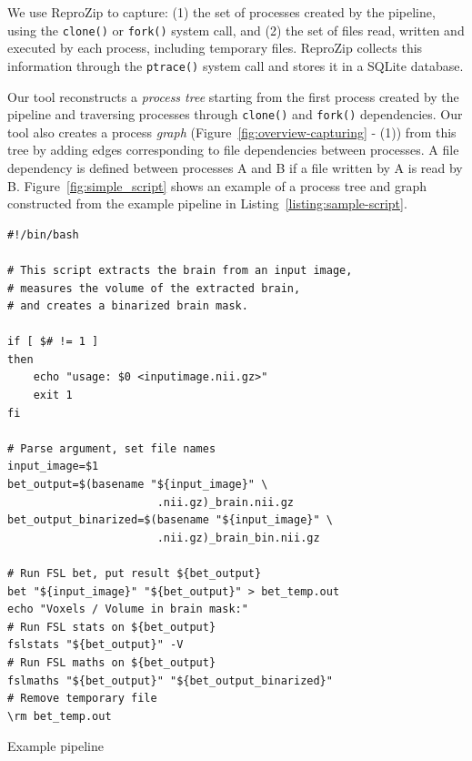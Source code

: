 \documentclass[a4paper,num-refs]{oup-contemporary}
\newcommand{\reprozip}[0]{ReproZip\xspace}
\begin{document}
We use \reprozip 
to capture: (1) the set of processes created by the
pipeline, using the \texttt{clone()} or \texttt{fork()} system call, and
(2) the set of files read, written and executed by each process, including
temporary files. \reprozip collects this information through the
\texttt{ptrace()} system call and stores it in a SQLite database.

Our tool reconstructs a \emph{process tree} starting from the first process
created by the pipeline and traversing processes through \texttt{clone()}
and \texttt{fork()} dependencies. Our tool also creates a process \emph{graph} 
(Figure~\ref{fig:overview-capturing} - (1)) from this tree
by adding edges corresponding to file dependencies between processes. A
file dependency is defined between processes A and B if a file written by A
is read by B. Figure~\ref{fig:simple_script} shows an example of a process
tree and graph constructed from the example pipeline in
Listing~\ref{listing:sample-script}.
\begin{listing}
\begin{verbatim}
#!/bin/bash

# This script extracts the brain from an input image,
# measures the volume of the extracted brain,
# and creates a binarized brain mask.

if [ $# != 1 ]
then
    echo "usage: $0 <inputimage.nii.gz>"
    exit 1
fi

# Parse argument, set file names
input_image=$1
bet_output=$(basename "${input_image}" \
                       .nii.gz)_brain.nii.gz
bet_output_binarized=$(basename "${input_image}" \
                       .nii.gz)_brain_bin.nii.gz

# Run FSL bet, put result ${bet_output}
bet "${input_image}" "${bet_output}" > bet_temp.out
echo "Voxels / Volume in brain mask:"
# Run FSL stats on ${bet_output}
fslstats "${bet_output}" -V
# Run FSL maths on ${bet_output}
fslmaths "${bet_output}" "${bet_output_binarized}"
# Remove temporary file
\rm bet_temp.out
\end{verbatim}
  \caption{Example pipeline}
  \label{listing:sample-script}
\end{listing}
\end{document}
